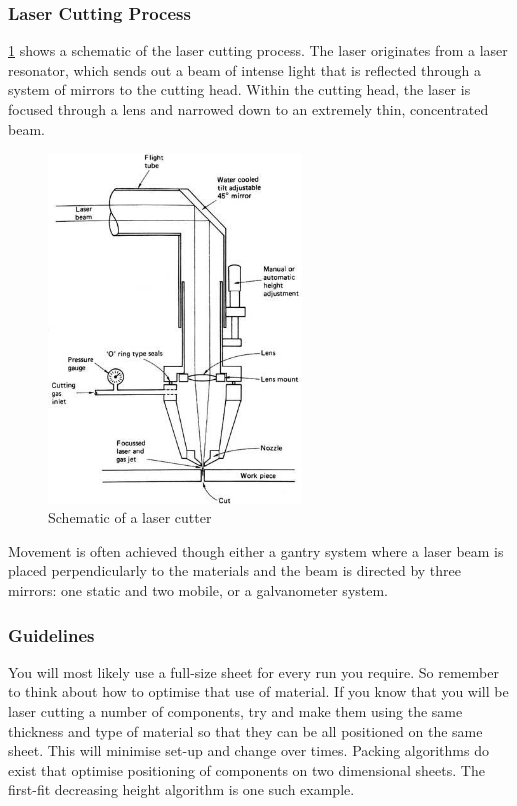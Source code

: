 \subsubsection{Laser Cutting Process}

\cref{fig-cutter} shows a schematic of the laser cutting process. The laser originates from a laser resonator, which sends out a beam of intense light that is reflected through a system of mirrors to the cutting head. Within the cutting head, the laser is focused through a lens and narrowed down to an extremely thin, concentrated beam.

\begin{figure}
    \centering
    \includegraphics[width=0.6\textwidth]{07_design_for_x/laser-cutter.jpg}
    \caption{Schematic of a laser cutter}\label{fig-cutter}
\end{figure}

Movement is often achieved though either a gantry system where a laser beam is placed perpendicularly to the materials and the beam is directed by three mirrors: one static and two mobile, or a galvanometer system.

\subsubsection{Guidelines}

You will most likely use a full-size sheet for every run you require. So remember to think about how to optimise that use of material. If you know that you will be laser cutting a number of components, try and make them using the same thickness and type of material so that they can be all positioned on the same sheet. This will minimise set-up and change over times. Packing algorithms do exist that optimise positioning of components on two dimensional sheets. The first-fit decreasing height algorithm is one such example.

